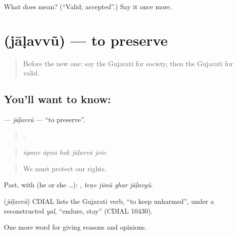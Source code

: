 \begin{tcolorbox}[breakable,colback=teal!4,colframe=teal!35!black,title={Before you move on}]
What does  mean? (\textquotedblleft{}Valid; accepted\textquotedblright{}.) Say it once more.
\end{tcolorbox}
\section[\texorpdfstring{\gu{જાળવવું} (jāḷavvũ)}{જાળવવું (jāḷavvũ)}]{ (jāḷavvũ) — to preserve}

\label{lesson:GU-C356-jalavvu}



\begin{quote}
Before the new one: say the Gujarati for society, then the Gujarati for valid.
\end{quote}

\subsection*{You'll want to know: }
\textbf{} — \emph{jāḷavvũ} — \textquotedblleft{}to preserve\textquotedblright{}.

\begin{quote}
    .
\end{quote}

\begin{quote}
\emph{āpaṇe āpṇā hak jāḷavvā joīe.}
\end{quote}

\begin{quote}
We must protect our rights.
\end{quote}

Past, with  (he or she …):    , \emph{teṇe jūnũ ghar jāḷavyũ}.

\begin{cousinweb}
\textbf{} (\emph{jāḷavvũ}) CDIAL lists the Gujarati verb, \textquotedblleft{}to keep unharmed\textquotedblright{}, under a reconstructed \emph{yal}, \textquotedblleft{}endure, stay\textquotedblright{} (CDIAL 10430).
\end{cousinweb}

\begin{grammarlens}[title={What you've built}]
One more word for giving reasons and opinions.
\end{grammarlens}

